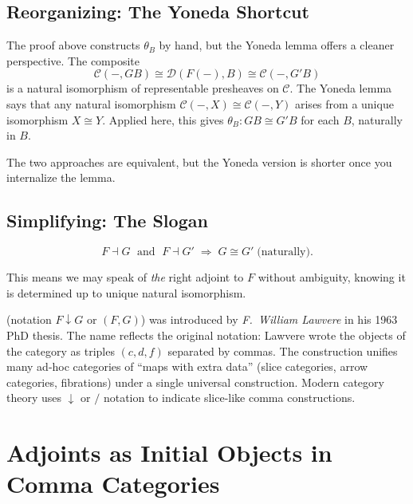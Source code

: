 \subsection{Reorganizing: The Yoneda Shortcut}

The proof above constructs $\theta_B$ by hand, but the Yoneda lemma offers a
cleaner perspective. The composite
\begin{equation*}
  \mathcal{C}(-, GB) \cong \mathcal{D}(F(-), B) \cong \mathcal{C}(-, G'B)
\end{equation*}
is a natural isomorphism of representable presheaves on $\mathcal{C}$. The
Yoneda lemma says that any natural isomorphism $\mathcal{C}(-, X) \cong
\mathcal{C}(-, Y)$ arises from a unique isomorphism $X \cong Y$. Applied here,
this gives $\theta_B : GB \cong G'B$ for each $B$, naturally in $B$.

The two approaches are equivalent, but the Yoneda version is shorter once you
internalize the lemma.

\subsection{Simplifying: The Slogan}

\begin{equation*}
  \boxed{\;F \dashv G \;\text{ and }\; F \dashv G'
  \;\Longrightarrow\;
  G \cong G' \;\text{(naturally)}.\;}
\end{equation*}

This means we may speak of \emph{the} right adjoint to $F$ without
ambiguity, knowing it is determined up to unique natural isomorphism.


\begin{nameorigin}
 (notation $F \downarrow G$ or $(F, G)$) was
introduced by \emph{F.\ William Lawvere} in his 1963 PhD thesis. The
name reflects the original notation: Lawvere wrote the objects of the
category as triples $(c, d, f)$ separated by commas. The construction
unifies many ad-hoc categories of ``maps with extra data'' (slice
categories, arrow categories, fibrations) under a single universal
construction. Modern category theory uses $\downarrow$ or $/$ notation
to indicate slice-like comma constructions.
\end{nameorigin}

\section{Adjoints as Initial Objects in Comma Categories}
\label{sec:adjoints-initial}

